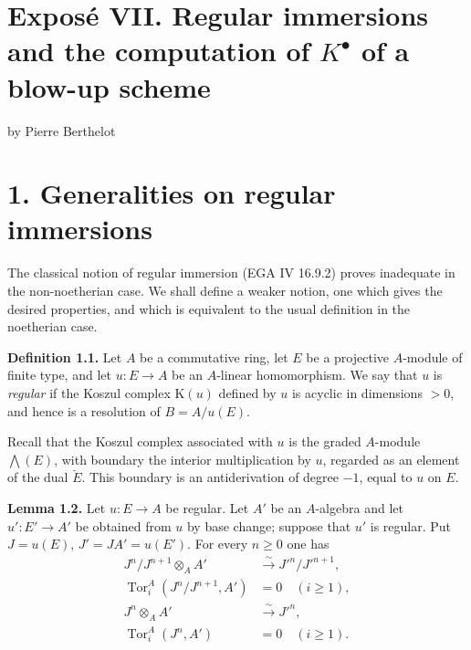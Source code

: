 \documentclass[11pt]{article}
\newcommand{\Tor}{\operatorname{Tor}}
\newcommand{\Spec}{\operatorname{Spec}}
\providecommand{\rad}{\operatorname{rad}}
\providecommand{\Tor}{\operatorname{Tor}}
\providecommand{\Ker}{\operatorname{Ker}}
\providecommand{\cO}{\mathcal O}
\begin{document}
\providecommand{\Kosz}{\mathrm K}
\providecommand{\Proj}{\operatorname{Proj}}
\providecommand{\Sym}{\operatorname{Sym}}
\providecommand{\gr}{\operatorname{gr}}
\providecommand{\Tor}{\operatorname{Tor}}
\providecommand{\Spec}{\operatorname{Spec}}
\providecommand{\Imf}{\operatorname{Im}}
\providecommand{\Ker}{\operatorname{Ker}}
\providecommand{\Id}{\operatorname{Id}}
\providecommand{\rad}{\operatorname{rad}}
\providecommand{\cO}{\mathcal O}
\providecommand{\cS}{\mathcal S}
\providecommand{\cJ}{\mathcal J}
\providecommand{\cN}{\mathcal N}
\providecommand{\bfP}{\mathbf P}
\providecommand{\bfA}{\mathbf A}


\section*{Exposé VII. Regular immersions and the computation of \texorpdfstring{$K^\bullet$}{K} of a blow-up scheme}
\begin{center}
by Pierre Berthelot
\end{center}

\section*{1. Generalities on regular immersions}

The classical notion of regular immersion (EGA IV 16.9.2) proves inadequate in the non-noetherian case. We shall define a weaker notion, one which gives the desired properties, and which is equivalent to the usual definition in the noetherian case.

\textbf{Definition 1.1.} Let \(A\) be a commutative ring, let \(E\) be a projective \(A\)-module of finite type, and let \(u:E\to A\) be an \(A\)-linear homomorphism. We say that \(u\) is \emph{regular} if the Koszul complex \(\Kosz(u)\) defined by \(u\) is acyclic in dimensions \(>0\), and hence is a resolution of \(B=A/u(E)\).

Recall that the Koszul complex associated with \(u\) is the graded \(A\)-module \(\bigwedge(E)\), with boundary the interior multiplication by \(u\), regarded as an element of the dual \(\check E\). This boundary is an antiderivation of degree \(-1\), equal to \(u\) on \(E\).

\textbf{Lemma 1.2.} Let \(u:E\to A\) be regular. Let \(A'\) be an \(A\)-algebra and let \(u':E'\to A'\) be obtained from \(u\) by base change; suppose that \(u'\) is regular. Put \(J=u(E)\), \(J'=JA'=u(E')\). For every \(n\ge0\) one has
\begin{align}
 J^n/J^{n+1}\otimes_AA'&\xrightarrow{\sim}J'^n/J'^{n+1}, \tag{1.2.1}\\
 \Tor_i^A(J^n/J^{n+1},A')&=0\quad(i\ge1), \tag{1.2.2}\\
 J^n\otimes_AA'&\xrightarrow{\sim}J'^n, \tag{1.2.3}\\
 \Tor_i^A(J^n,A')&=0\quad(i\ge1). \tag{1.2.4}
\end{align}
\end{document}
